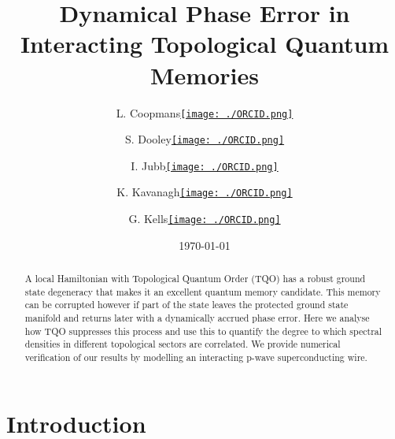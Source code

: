 \documentclass[aps,pra,floatfix,footinbib,longbibliography,twocolumn,superscriptaddress, preprintnumbers, nobibnotes]{revtex4-1}
\begin{document}
\title{Dynamical Phase Error in Interacting Topological Quantum Memories}
\author{L. Coopmans\href{https://orcid.org/0000-0001-6501-5420}{\texttt{[image: ./ORCID.png]}}} 
\author{S. Dooley\href{https://orcid.org/0000-0002-2856-8840}{\texttt{[image: ./ORCID.png]}}}
\author{I. Jubb\href{https://orcid.org/0000-0001-7339-2058}{\texttt{[image: ./ORCID.png]}}}
\author{K. Kavanagh\href{https://orcid.org/0000-0002-6046-8495}{\texttt{[image: ./ORCID.png]}}}
\author{G. Kells\href{https://orcid.org/0000-0003-3008-8691}{\texttt{[image: ./ORCID.png]}}}
\date{\today}
\begin{abstract}
A local Hamiltonian with Topological Quantum Order (TQO) has a robust ground state degeneracy that makes it an excellent quantum memory candidate. This memory can be corrupted however if part of the state leaves the protected ground state manifold and returns later with a dynamically accrued phase error.  Here we analyse how TQO suppresses this process and use this to quantify the degree to which spectral densities in different topological sectors are correlated. We provide numerical verification of our results by modelling an interacting p-wave superconducting wire. 
\end{abstract}

\maketitle

\section{Introduction}
\end{document}
